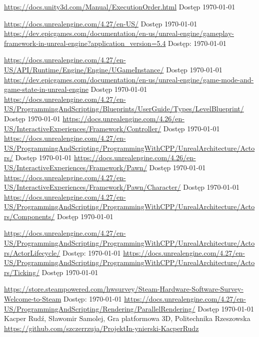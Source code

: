 \documentclass[12pt,twoside]{article}
\begin{document}
\begin{thebibliography}{4}
 \url{https://docs.unity3d.com/Manual/ExecutionOrder.html} Dostęp \today

 \url{https://docs.unrealengine.com/4.27/en-US/} Dostęp \today
{} \url{https://dev.epicgames.com/documentation/en-us/unreal-engine/gameplay-framework-in-unreal-engine?application_version=5.4} Dostęp: \today

 \url{https://docs.unrealengine.com/4.27/en-US/API/Runtime/Engine/Engine/UGameInstance/} Dostęp \today
{}  \url{https://dev.epicgames.com/documentation/en-us/unreal-engine/game-mode-and-game-state-in-unreal-engine} Dostęp \today
{}  \url{https://docs.unrealengine.com/4.27/en-US/ProgrammingAndScripting/Blueprints/UserGuide/Types/LevelBlueprint/} Dostęp \today
{}  \url{https://docs.unrealengine.com/4.26/en-US/InteractiveExperiences/Framework/Controller/} Dostęp \today
{}  \url{https://docs.unrealengine.com/4.27/en-US/ProgrammingAndScripting/ProgrammingWithCPP/UnrealArchitecture/Actors/} Dostęp \today
{}  \url{https://docs.unrealengine.com/4.26/en-US/InteractiveExperiences/Framework/Pawn/} Dostęp \today
{}  \url{https://docs.unrealengine.com/4.27/en-US/InteractiveExperiences/Framework/Pawn/Character/} Dostęp \today
{}  \url{https://docs.unrealengine.com/4.27/en-US/ProgrammingAndScripting/ProgrammingWithCPP/UnrealArchitecture/Actors/Components/} Dostęp \today

 \url{https://docs.unrealengine.com/4.27/en-US/ProgrammingAndScripting/ProgrammingWithCPP/UnrealArchitecture/Actors/ActorLifecycle/} Dostęp: \today
{} \url{https://docs.unrealengine.com/4.27/en-US/ProgrammingAndScripting/ProgrammingWithCPP/UnrealArchitecture/Actors/Ticking/} Dostęp \today


 \url{https://store.steampowered.com/hwsurvey/Steam-Hardware-Software-Survey-Welcome-to-Steam} Dostęp: \today
{} \url{https://docs.unrealengine.com/4.27/en-US/ProgrammingAndScripting/Rendering/ParallelRendering/} Dostęp \today
{} Kacper Rudź, Sławomir Samolej, Gra platformowa 3D, Politechnika Rzeszowska \url{https://github.com/szczerrzuja/ProjektIn-ynierski-KacperRudz}

\end{thebibliography}

\clearpage

\makesummary
\end{document}

